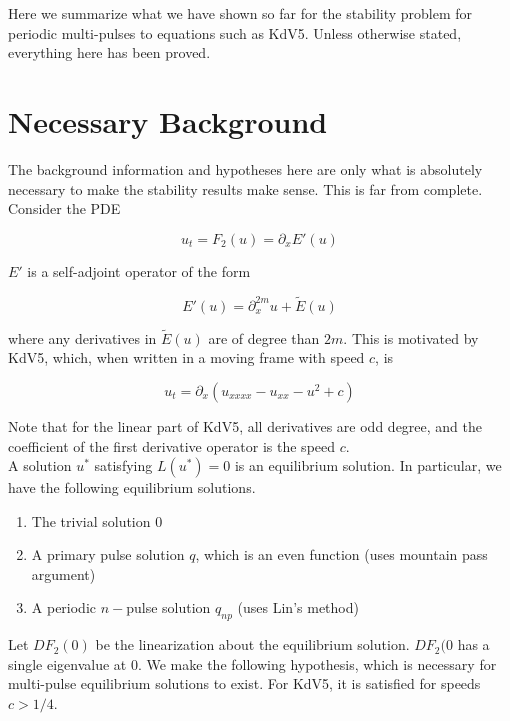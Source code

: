 \documentclass[12pt]{article}
\begin{document}
Here we summarize what we have shown so far for the stability problem for periodic multi-pulses to equations such as KdV5. Unless otherwise stated, everything here has been proved.

\section{Necessary Background}

The background information and hypotheses here are only what is absolutely necessary to make the stability results make sense. This is far from complete.\\

Consider the PDE

\begin{equation}\label{PDE}
u_t = F_2(u) = \partial_x E'(u)
\end{equation}

$E'$ is a self-adjoint operator of the form

\[
E'(u) = \partial_x^{2m}u + \tilde{E}(u)
\]

where any derivatives in $\tilde{E}(u)$ are of degree than $2m$. This is motivated by KdV5, which, when written in a moving frame with speed $c$, is

\begin{equation}\label{KdV5}
u_t = \partial_x(u_{xxxx} - u_{xx} - u^2 + c)
\end{equation}

Note that for the linear part of KdV5, all derivatives are odd degree, and the coefficient of the first derivative operator is the speed $c$.\\

A solution $u^*$ satisfying $L(u^*) = 0$ is an equilibrium solution. In particular, we have the following equilibrium solutions.

\begin{enumerate}
	\item The trivial solution 0
	\item A primary pulse solution $q$, which is an even function (uses mountain pass argument)
	\item A periodic $n-$pulse solution $q_{np}$ (uses Lin's method)
\end{enumerate}

Let $D F_2(0)$ be the linearization about the equilibrium solution. $D F_2(0$ has a single eigenvalue at 0. We make the following hypothesis, which is necessary for multi-pulse equilibrium solutions to exist. For KdV5, it is satisfied for speeds $c > 1/4$.
\end{document}
